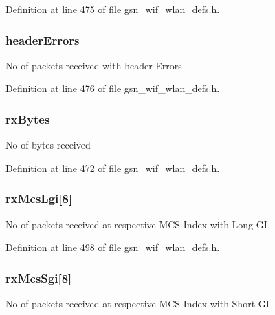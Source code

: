 Definition at line 475 of file gsn\_\-wif\_\-wlan\_\-defs.h.

\hypertarget{a00419_a0f1c4f5fe659d34ed0dcc9dd23be1722}{
\subsubsection[{headerErrors}]{ {\bf headerErrors}}}
\label{a00419_a0f1c4f5fe659d34ed0dcc9dd23be1722}
No of packets received with header Errors 

Definition at line 476 of file gsn\_\-wif\_\-wlan\_\-defs.h.

\hypertarget{a00419_a52f6cb688103c306d61204cb54e4034e}{
\subsubsection[{rxBytes}]{ {\bf rxBytes}}}
\label{a00419_a52f6cb688103c306d61204cb54e4034e}
No of bytes received 

Definition at line 472 of file gsn\_\-wif\_\-wlan\_\-defs.h.

\hypertarget{a00419_a8747c8baeced4da14ebab28d32c0d86a}{
\subsubsection[{rxMcsLgi}]{ {\bf rxMcsLgi}\mbox{[}8\mbox{]}}}
\label{a00419_a8747c8baeced4da14ebab28d32c0d86a}
No of packets received at respective MCS Index with Long GI 

Definition at line 498 of file gsn\_\-wif\_\-wlan\_\-defs.h.

\hypertarget{a00419_a778a7aadda15a017df57abcdb77f2c04}{
\subsubsection[{rxMcsSgi}]{ {\bf rxMcsSgi}\mbox{[}8\mbox{]}}}
\label{a00419_a778a7aadda15a017df57abcdb77f2c04}
No of packets received at respective MCS Index with Short GI 

